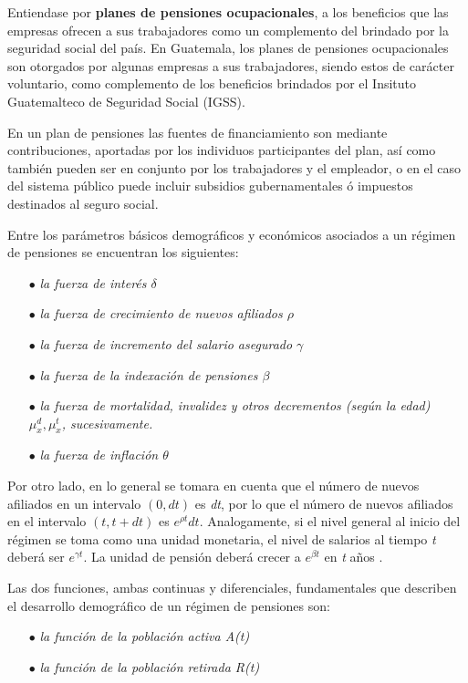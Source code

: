\documentclass[12pt,letterpaper,titlepage]{article}
\begin{document}
Entiendase por \textbf{planes de pensiones ocupacionales}, a los beneficios que las empresas ofrecen a sus trabajadores como un complemento del brindado por la seguridad social del país. En Guatemala, los planes de pensiones ocupacionales son otorgados por algunas empresas a sus trabajadores, siendo estos de carácter voluntario, como complemento de los beneficios brindados por el Insituto Guatemalteco de Seguridad Social (IGSS). 


 En un plan de pensiones las fuentes de financiamiento son mediante contribuciones, aportadas por los individuos participantes del plan, así como también pueden ser en conjunto por los trabajadores y el empleador, o en el caso del sistema público puede incluir subsidios gubernamentales ó impuestos destinados al seguro social. 
 
 Entre los parámetros básicos demográficos y económicos asociados a un régimen de pensiones se encuentran los siguientes:
 
\begin{itemize}
	\item [$\bullet$] \textit{la fuerza de interés $\delta$}
 	\item [$\bullet$] \textit{la fuerza de crecimiento de nuevos afiliados $\rho$}
 	\item [$\bullet$] \textit{la fuerza de incremento del salario asegurado $\gamma$}
 	\item [$\bullet$] \textit{la fuerza de la indexación de pensiones $\beta$}
 	\item [$\bullet$] \textit{la fuerza de mortalidad, invalidez y otros decrementos (según la edad) $\mu_{x}^{d}, \mu_{x}^{t}$, sucesivamente.}
 	\item [$\bullet$] \textit{la fuerza de inflación $\theta$}
 \end{itemize}
 
  
 Por otro lado, en lo general se tomara en cuenta que el número de nuevos afiliados en un intervalo $(0, dt)$ es \textit{dt}, por lo que el número de nuevos afiliados en el intervalo $(t, t+dt)$ es $e^{\rho t}dt$. Analogamente, si el nivel general al inicio del régimen se toma como una unidad monetaria, el nivel de salarios al tiempo \textit{t} deberá ser $e^{\gamma t}$. La unidad de pensión deberá crecer a $e^{\beta t}$ en \textit{t} años \cite{778}.
 
Las dos funciones, ambas continuas y diferenciales, fundamentales que describen el desarrollo demográfico de un régimen de pensiones son:

\begin{itemize}
	\item [$\bullet$] \textit{la función de la población activa A(t)}
	\item [$\bullet$] \textit{la función de la población retirada R(t)}
\end{itemize}
 
\end{document}
